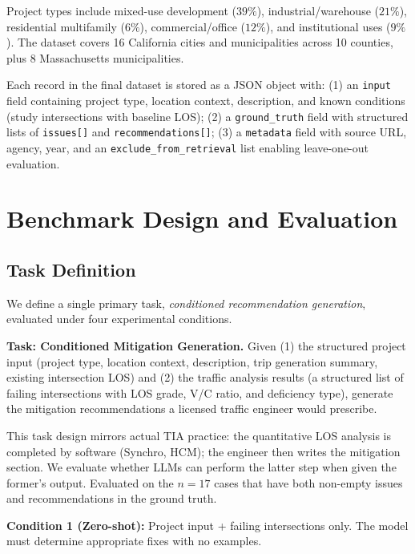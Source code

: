 \documentclass[preprint,12pt]{elsarticle}
\begin{document}
Project types include mixed-use development ($39\%$), industrial/warehouse
($21\%$), residential multifamily ($6\%$), commercial/office
($12\%$), and institutional uses ($9\%$).
The dataset covers 16 California cities and municipalities across
10 counties, plus 8 Massachusetts municipalities.

Each record in the final dataset is stored as a JSON object with:
(1) an \texttt{input} field containing project type, location context,
description, and known conditions (study intersections with baseline LOS);
(2) a \texttt{ground\_truth} field with structured lists of
\texttt{issues[]} and \texttt{recommendations[]};
(3) a \texttt{metadata} field with source URL, agency, year, and an
\texttt{exclude\_from\_retrieval} list enabling leave-one-out evaluation.

\section{Benchmark Design and Evaluation}
\label{sec:method}

\subsection{Task Definition}

We define a single primary task, \emph{conditioned recommendation generation},
evaluated under four experimental conditions.

\textbf{Task: Conditioned Mitigation Generation.}
Given (1) the structured project input (project type, location context,
description, trip generation summary, existing intersection LOS) and (2) the
traffic analysis results (a structured list of failing intersections with
LOS grade, V/C ratio, and deficiency type), generate the mitigation
recommendations a licensed traffic engineer would prescribe.

This task design mirrors actual TIA practice: the quantitative LOS analysis
is completed by software (Synchro, HCM); the engineer then writes the
mitigation section. We evaluate whether LLMs can perform the latter step
when given the former's output.
Evaluated on the $n = 17$ cases that have both non-empty issues and
recommendations in the ground truth.

\textbf{Condition 1 (Zero-shot):} Project input + failing intersections only.
The model must determine appropriate fixes with no examples.
\end{document}
